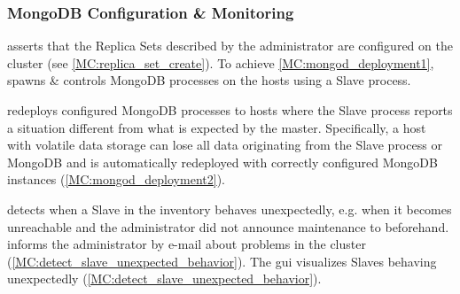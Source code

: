 \subsubsection{MongoDB Configuration \& Monitoring}
\begin{description}
	 \mamid asserts that the Replica Sets described by the administrator are configured on the cluster 
	(see \ref{MC:replica_set_create}). \done
	 To achieve \ref{MC:mongod_deployment1}, \mamid spawns \& controls MongoDB processes on the hosts 
	using a Slave process. \done
	\begin{description}
		 \mamid redeploys configured MongoDB processes to hosts where the Slave process reports 
		a situation different from what is expected by the master. \done
		 Specifically, a host with volatile data storage can lose all data originating 
		from the Slave process or MongoDB and is automatically redeployed with correctly configured MongoDB instances 
		(\ref{MC:mongod_deployment2}). \done
	\end{description}
	
	 \mamid detects when a Slave in the inventory behaves unexpectedly, e.g. when 
	it becomes unreachable and the administrator did not announce maintenance to \mamid beforehand. \done
	 \mamid informs the administrator by e-mail about problems in the cluster 
	(\ref{MC:detect_slave_unexpected_behavior}). \done
	 The gui visualizes Slaves behaving unexpectedly (\ref{MC:detect_slave_unexpected_behavior}). \done
\end{description}

